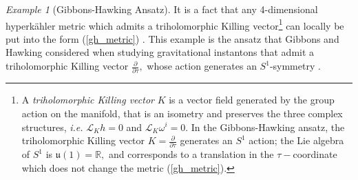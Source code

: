 \documentclass[a4paper,12pt, onecolumn, notitlepage]{article}
\theoremstyle{definition}
\theoremstyle{remark}
\newtheorem{ex}[thm]{Example}
\newcommand{\ie}{\emph{i.e.} }
\newcommand{\w}{\omega}
\newcommand{\ddt}[1]{\frac{\partial #1}{\partial \tau}}
\newcommand{\HK}{hyperk\"ahler }
\begin{document}
\begin{ex}[Gibbons-Hawking Ansatz]
	It is a fact that any 4-dimensional \HK metric which admits a triholomorphic Killing vector\footnote{A \emph{triholomorphic Killing vector} $K$ is a vector field generated by the group action on the manifold, that is an isometry and preserves the three complex structures, \ie $\mathcal{L}_{K}h=0$ and $\mathcal{L}_{K}\w^{i}=0.$ In the Gibbons-Hawking ansatz, the triholomorphic Killing vector $K=\ddt{}$ generates an $S^{1}$ action; the Lie algebra of $S^{1}$ is $\mathfrak{u}(1)=\mathbb{R},$ and corresponds to a translation in the $\tau-$coordinate which does not change the metric (\ref{gh_metric}).} can locally be put into the form (\ref{gh_metric}) \cite{solitons}. This example is the ansatz that Gibbons and Hawking considered when studying gravitational instantons that admit a triholomorphic Killing vector $\ddt{},$ whose action generates an $S^{1}$-symmetry \cite{gibbons_1978}.\\
\end{ex}
\end{document}
